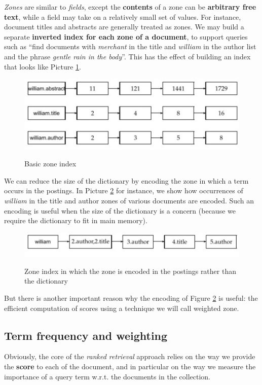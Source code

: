 \textit{Zones} are similar to \textit{fields}, except the \textbf{contents} of a zone can be \textbf{arbitrary free text}, while a field may take on a relatively small set of values. For instance, document titles and abstracts are generally treated as zones. We may build a separate \textbf{inverted index for each zone of a document}, to support queries such as “find documents with \textit{merchant} in the title and \textit{william} in the author list and the phrase \textit{gentle rain in the body}”. This has the effect of building an index that looks like Picture \ref{zi}.

\begin{figure}[h!]
		\centering
		\includegraphics[scale = 2.0]{img/zone index.jpg}
		\label{zi}
        \caption{Basic zone index}
\end{figure}

We can reduce the size of the dictionary by encoding the zone in which a term occurs in the postings. In Picture \ref{zip} for instance, we show how occurrences of \textit{william} in the title and author zones of various documents are encoded. Such an encoding is useful when the size of the dictionary is a concern (because we require the dictionary to fit in main memory). 

\begin{figure}[h!]
		\centering
		\includegraphics[scale = 2.0]{img/zone index with postings.jpg}
		\label{zip}
        \caption{Zone index in which the zone is encoded in the postings rather than the dictionary}
\end{figure}

But there is another important reason why the encoding of Figure \ref{zip} is useful: the efficient computation of scores using a technique we will call weighted zone.

\subsection{Term frequency and weighting}
Obviously, the core of the \textit{ranked retrieval} approach relies on the way we provide the \textbf{score} to each of the document, and in particular on the way we measure the importance of a query term w.r.t. the documents in the collection. 

